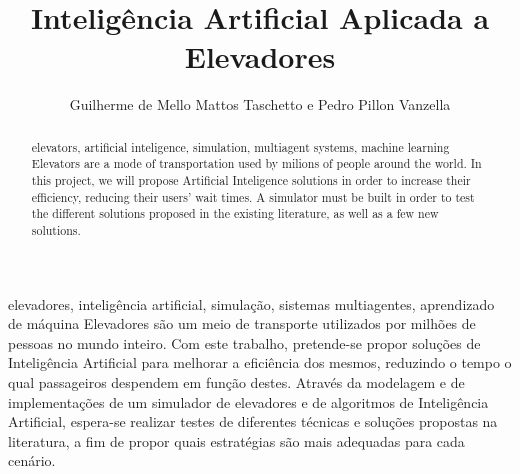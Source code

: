 \documentclass[portuguese,oneside]{tcc}
\author{Guilherme de Mello Mattos Taschetto e Pedro Pillon Vanzella}
\title{Inteligência Artificial Aplicada a Elevadores}
      {Artificial Intelligence Applied to Elevators}
\begin{document}
\begin{resumo}{elevadores, inteligência artificial, simulação, sistemas multiagentes, aprendizado de máquina}
Elevadores são um meio de transporte utilizados por milhões de pessoas no mundo
inteiro. Com este trabalho, pretende-se propor soluções de Inteligência
Artificial para melhorar a eficiência dos mesmos, reduzindo o tempo o qual
passageiros despendem em função destes. Através da modelagem e de implementações
de um simulador de elevadores e de algoritmos de Inteligência Artificial,
espera-se realizar testes de diferentes técnicas e soluções propostas na
literatura, a fim de propor quais estratégias são mais adequadas para cada
cenário.
\end{resumo}

\begin{abstract}{elevators, artificial inteligence, simulation, multiagent systems, machine learning}
  Elevators are a mode of transportation used by milions of people around the
  world. In this project, we will propose Artificial Inteligence solutions in
  order to increase their efficiency, reducing their users' wait times.
  A simulator must be built in order to test the different solutions proposed in
  the existing literature, as well as a few new solutions.
\end{abstract}

\tableofcontents












\end{document}
